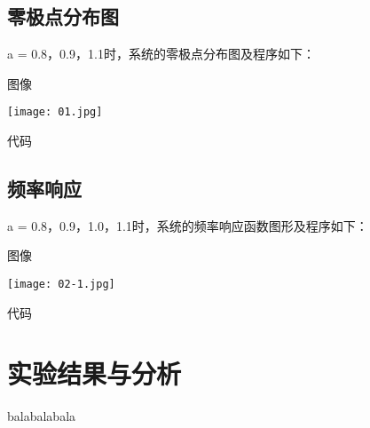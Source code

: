 \documentclass{zjureport}
\begin{document}
  \subsection{零极点分布图}
    a = 0.8，0.9，1.1时，系统的零极点分布图及程序如下：
    \begin{clause}
      \item 图像
      \begin{center}
        \texttt{[image: 01.jpg]}
      \end{center}
      \item 代码
      
    \end{clause}

  \subsection{频率响应}
    a = 0.8，0.9，1.0，1.1时，系统的频率响应函数图形及程序如下：
    \begin{clause}
      \item 图像
      \begin{center}
        \texttt{[image: 02-1.jpg]}
      \end{center}
      \item 代码
      
    \end{clause}

\section{实验结果与分析}

balabalabala
\end{document}
